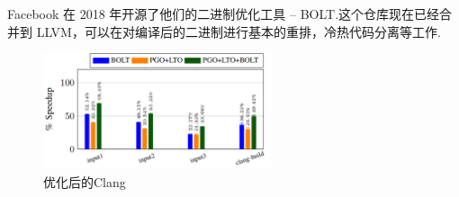 
Facebook 在 2018 年开源了他们的二进制优化工具 -- BOLT\cite{facebook2018bolt, panchenko2019bolt}.这个仓库现在已经合并到 LLVM，可以在对编译后的二进制进行基本的重排，冷热代码分离等工作.

\begin{figure}[H]
    \centering
    \includegraphics[width=0.6\textwidth]{images/perf_improv_clang.png}
    \caption{优化后的Clang}
\end{figure}
